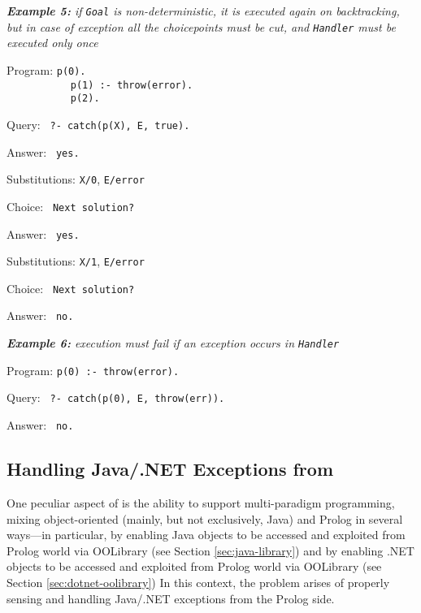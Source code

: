 \medskip\noindent
\textit{\textbf{Example 5:} if \texttt{Goal} is non-deterministic, it is executed again on backtracking, but in case of exception all the choicepoints must be cut, and \texttt{Handler} must be executed only once}

Program: \texttt{p(0).}\\
\mbox{\texttt{~~~~~~~~~~~}}\texttt{p(1) :- throw(error).}\\
\mbox{\texttt{~~~~~~~~~~~}}\texttt{p(2).}

Query: \texttt{ ?- catch(p(X), E, true).}

Answer: \texttt{ yes.}

Substitutions: \texttt{X/0}, \texttt{E/error}

Choice: \texttt{ Next solution?}

Answer: \texttt{ yes.}

Substitutions: \texttt{X/1}, \texttt{E/error}

Choice: \texttt{ Next solution?}

Answer: \texttt{ no.}


\medskip\noindent
\textit{\textbf{Example 6:} execution must fail if an exception occurs in \texttt{Handler}}

Program: \texttt{p(0) :- throw(error).}

Query: \texttt{ ?- catch(p(0), E, throw(err)).}

Answer: \texttt{ no.}

\subsection{Handling Java/.NET Exceptions from \tuprolog}
\label{ssec:java-exceptions-in-tuprolog}

One peculiar aspect of \tuprolog{} is the ability to support multi-paradigm programming, mixing object-oriented (mainly, but not exclusively, Java) and Prolog in several ways---in particular, by enabling Java objects to be accessed and exploited from Prolog world via OOLibrary (see Section \ref{sec:java-library}) and by enabling .NET objects to be accessed and exploited from Prolog world via OOLibrary (see Section \ref{sec:dotnet-oolibrary})
%
In this context, the problem arises of properly sensing and handling Java/.NET exceptions from the Prolog side.

